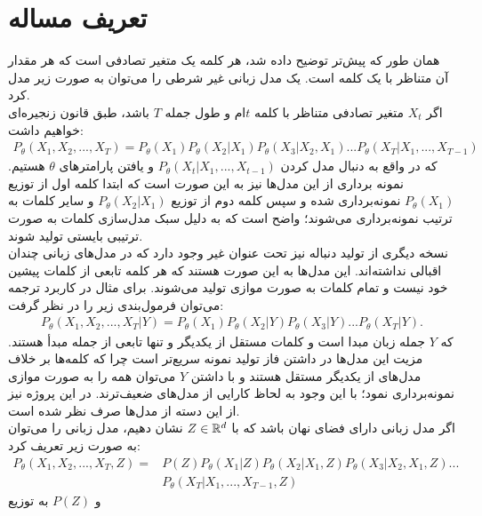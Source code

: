 \section{تعریف مساله}
همان طور که پیش‌تر توضیح داده شد، هر کلمه یک متغیر تصادفی است که هر مقدار آن متناظر با یک کلمه است. یک مدل زبانی غیر شرطی \autoregressive{} را می‌توان به صورت زیر مدل کرد.\\
اگر $X_t$ متغیر تصادفی متناظر با کلمه $t$ام و طول جمله $T$ باشد، طبق قانون زنجیره‌ای خواهیم داشت:
\begin{equation}\begin{split}
P_\theta(X_1, X_2, ... , X_T) = P_\theta(X_1) P_\theta(X_2|X_1) P_\theta(X_3|X_2, X_1) ... P_\theta(X_T|X_1, ..., X_{T-1})
\end{split}\end{equation}
که در واقع به دنبال مدل کردن $P_\theta(X_t|X_1, ..., X_{t-1 })$ و یافتن پارامتر‌های $\theta$ هستیم. نمونه برداری از این مدل‌ها نیز به این صورت است که ابتدا کلمه اول از توزیع $P_\theta(X_1)$ نمونه‌برداری شده و سپس کلمه دوم از توزیع $P_\theta(X_2|X_1)$ و سایر کلمات به ترتیب نمونه‌برداری می‌شوند؛ واضح است که به دلیل سبک مدل‌سازی کلمات به صورت ترتیبی بایستی تولید شوند. \\
نسخه دیگری از تولید دنباله نیز تحت عنوان غیر \autoregressive{} وجود دارد که در مدل‌های زبانی چندان اقبالی نداشته‌اند. این مدل‌ها به این صورت هستند که هر کلمه تابعی از کلمات پیشین خود نیست و تمام کلمات به صورت موازی تولید می‌شوند. برای مثال در کاربرد ترجمه می‌توان فرمول‌بندی زیر را در نظر گرفت:
\begin{align}
P_\theta(X_1, X_2, ... , X_T|Y) = P_\theta(X_1) P_\theta(X_2|Y) P_\theta(X_3|Y) ... P_\theta(X_T|Y).
\end{align}
که $Y$ جمله زبان مبدا است و کلمات مستقل از یکدیگر و تنها تابعی از جمله مبدأ هستند. مزیت این مدل‌ها در داشتن فاز تولید نمونه سریع‌تر است چرا که کلمه‌ها بر خلاف مدل‌های \autoregressive{} از یکدیگر مستقل هستند و با داشتن $Y$ می‌توان همه را به صورت موازی نمونه‌برداری نمود؛ با این وجود به لحاظ کارایی از مدل‌های \autoregressive{} ضعیف‌ترند. در این پروژه نیز از این دسته از مدل‌ها صرف نظر شده است.
\\
اگر مدل زبانی دارای فضای نهان باشد که با $Z \in {\mathbb{R}}^d$ نشان دهیم، مدل زبانی را می‌توان به صورت زیر تعریف کرد:
\begin{align}
P_\theta(X_1, X_2, ... , X_T,Z) =&P(Z) P_\theta(X_1|Z) P_\theta(X_2|X_1,Z) P_\theta(X_3|X_2, X_1,Z) ... \nonumber\\& P_\theta(X_T|X_1, ..., X_{T-1},Z)
\end{align}
و $P(Z)$ به توزیع
